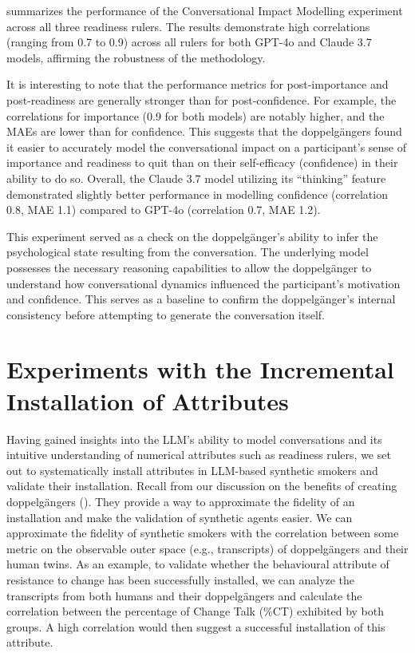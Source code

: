  summarizes the performance of the Conversational Impact Modelling experiment across all three readiness rulers. The results demonstrate high correlations (ranging from 0.7 to 0.9) across all rulers for both GPT-4o and Claude 3.7 models, affirming the robustness of the methodology.

It is interesting to note that the performance metrics for post-importance and post-readiness are generally stronger than for post-confidence. For example, the correlations for importance (0.9 for both models) are notably higher, and the MAEs are lower than for confidence. This suggests that the doppelgängers found it easier to accurately model the conversational impact on a participant's sense of importance and readiness to quit than on their self-efficacy (confidence) in their ability to do so. Overall, the Claude 3.7 model utilizing its ``thinking'' feature demonstrated slightly better performance in modelling confidence (correlation 0.8, MAE 1.1) compared to GPT-4o (correlation 0.7, MAE 1.2).



This experiment served as a check on the doppelgänger's ability to infer the psychological state resulting from the conversation. The underlying model possesses the necessary reasoning capabilities to allow the doppelgänger to understand how conversational dynamics influenced the participant's motivation and confidence. This serves as a baseline to confirm the doppelgänger's internal consistency before attempting to generate the conversation itself.



\section{Experiments with the Incremental Installation of Attributes}
Having gained insights into the LLM's ability to model conversations and its intuitive understanding of numerical attributes such as readiness rulers, we set out to systematically install attributes in LLM-based synthetic smokers and validate their installation. Recall from our discussion on the benefits of creating doppelgängers (). They provide a way to approximate the fidelity of an installation and make the validation of synthetic agents easier. We can approximate the fidelity of synthetic smokers with the correlation between some metric on the observable outer space (e.g., transcripts) of doppelgängers and their human twins. As an example, to validate whether the behavioural attribute of resistance to change has been successfully installed, we can analyze the transcripts from both humans and their doppelgängers and calculate the correlation between the percentage of Change Talk (\%CT) exhibited by both groups. A high correlation would then suggest a successful installation of this attribute.


